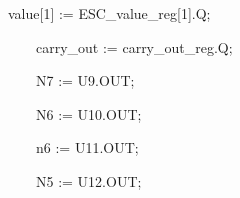 \documentclass[a4paper]{article}
\begin{document}
\bigskip


\bigskip


\bigskip


\bigskip


\bigskip


\bigskip


\bigskip


\bigskip


\bigskip


\bigskip


\bigskip


\bigskip


\bigskip


\bigskip


\bigskip


\bigskip


\bigskip


\bigskip


\bigskip


\bigskip


\bigskip


\bigskip


\bigskip


\bigskip


\bigskip


\bigskip


\bigskip


\bigskip



\begin{center}
\begin{minipage}{5.96875in}
{\ttfamily\color[rgb]{0.0,0.0,0.039215688}
\ \ \ \ value[1] := ESC\_value\_reg[1].Q;}

{\ttfamily\color[rgb]{0.0,0.0,0.039215688}
\ \ \ \ \ \ \ \ carry\_out := carry\_out\_reg.Q;}

{\ttfamily\color[rgb]{0.0,0.0,0.039215688}
\ \ \ \ \ \ \ \ N7 := U9.OUT;}

{\ttfamily\color[rgb]{0.0,0.0,0.039215688}
\ \ \ \ \ \ \ \ N6 := U10.OUT;}

{\ttfamily\color[rgb]{0.0,0.0,0.039215688}
\ \ \ \ \ \ \ \ n6 := U11.OUT;}

{\ttfamily\color[rgb]{0.0,0.0,0.039215688}
\ \ \ \ \ \ \ \ N5 := U12.OUT;}


\bigskip
\end{minipage}
\end{center}

\bigskip


\bigskip


\bigskip
\end{document}
